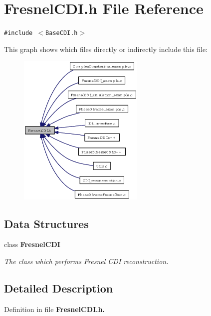 \section{Fresnel\-CDI.h File Reference}
\label{FresnelCDI_8h}
{\tt \#include $<$Base\-CDI.h$>$}\par


This graph shows which files directly or indirectly include this file:\begin{figure}[H]
\begin{center}
\leavevmode
\includegraphics[width=170pt]{FresnelCDI_8h__dep__incl}
\end{center}
\end{figure}
\subsection*{Data Structures}
\begin{CompactItemize}
\item 
class \bf{Fresnel\-CDI}
\begin{CompactList}\small\item\em The class which performs Fresnel CDI reconstruction. \item\end{CompactList}\end{CompactItemize}


\subsection{Detailed Description}


Definition in file \bf{Fresnel\-CDI.h}.